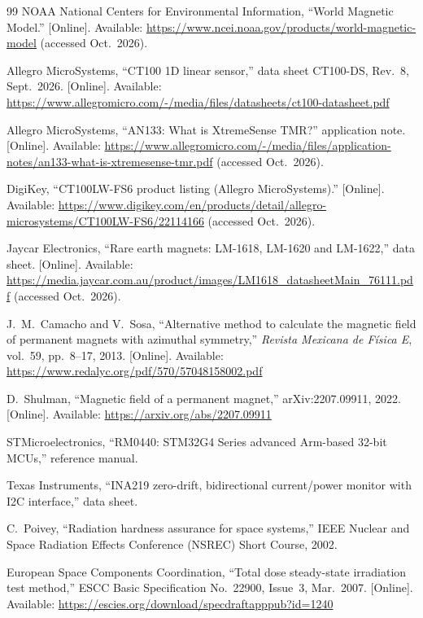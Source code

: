 \documentclass[12pt,a4paper]{article}
\begin{document}
\begin{thebibliography}{99}
NOAA National Centers for Environmental Information, ``World Magnetic Model.'' [Online]. Available: \url{https://www.ncei.noaa.gov/products/world-magnetic-model} (accessed Oct.\ 2026).

Allegro MicroSystems, ``CT100 1D linear sensor,'' data sheet CT100-DS, Rev.~8, Sept.~2026. [Online]. Available: \url{https://www.allegromicro.com/-/media/files/datasheets/ct100-datasheet.pdf}

Allegro MicroSystems, ``AN133: What is XtremeSense TMR?'' application note. [Online]. Available: \url{https://www.allegromicro.com/-/media/files/application-notes/an133-what-is-xtremesense-tmr.pdf} (accessed Oct.\ 2026).

DigiKey, ``CT100LW-FS6 product listing (Allegro MicroSystems).'' [Online]. Available: \url{https://www.digikey.com/en/products/detail/allegro-microsystems/CT100LW-FS6/22114166} (accessed Oct.\ 2026).

Jaycar Electronics, ``Rare earth magnets: LM-1618, LM-1620 and LM-1622,'' data sheet. [Online]. Available: \url{https://media.jaycar.com.au/product/images/LM1618_datasheetMain_76111.pdf} (accessed Oct.\ 2026).

J.\ M.\ Camacho and V.\ Sosa, ``Alternative method to calculate the magnetic field of permanent magnets with azimuthal symmetry,'' \emph{Revista Mexicana de F\'isica E}, vol.~59, pp.~8--17, 2013. [Online]. Available: \url{https://www.redalyc.org/pdf/570/57048158002.pdf}

D.\ Shulman, ``Magnetic field of a permanent magnet,'' arXiv:2207.09911, 2022. [Online]. Available: \url{https://arxiv.org/abs/2207.09911}

STMicroelectronics, ``RM0440: STM32G4 Series advanced Arm-based 32-bit MCUs,'' reference manual.

Texas Instruments, ``INA219 zero-drift, bidirectional current/power monitor with I2C interface,'' data sheet.

C.\ Poivey, ``Radiation hardness assurance for space systems,'' IEEE Nuclear and Space Radiation Effects Conference (NSREC) Short Course, 2002.

European Space Components Coordination, ``Total dose steady-state irradiation test method,'' ESCC Basic Specification No.~22900, Issue~3, Mar.~2007. [Online]. Available: \url{https://escies.org/download/specdraftapppub?id=1240}


\end{thebibliography}
\end{document}
